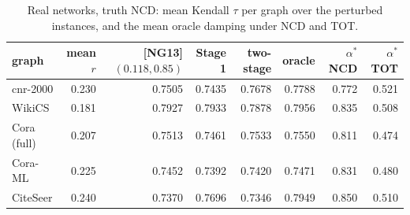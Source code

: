 \begin{table}[!htbp]
\centering
\footnotesize
\caption{Real networks, truth NCD: mean Kendall $\tau$ per graph over the perturbed instances, and the mean oracle damping under NCD and TOT.}
\label{tab:realdetail}
\begin{tabular}{@{}lrrrrrrr@{}}
\toprule
graph & mean $r$ & [NG13] $(0.118,0.85)$ & Stage 1 & two-stage & oracle & $\alpha^*$ NCD & $\alpha^*$ TOT \\
\midrule
cnr-2000 & 0.230 & 0.7505 & 0.7435 & 0.7678 & 0.7788 & 0.772 & 0.521 \\
WikiCS & 0.181 & 0.7927 & 0.7933 & 0.7878 & 0.7956 & 0.835 & 0.508 \\
Cora (full) & 0.207 & 0.7513 & 0.7461 & 0.7533 & 0.7550 & 0.811 & 0.474 \\
Cora-ML & 0.225 & 0.7452 & 0.7392 & 0.7420 & 0.7471 & 0.831 & 0.480 \\
CiteSeer & 0.240 & 0.7370 & 0.7696 & 0.7346 & 0.7949 & 0.850 & 0.510 \\
\bottomrule
\end{tabular}
\end{table}
